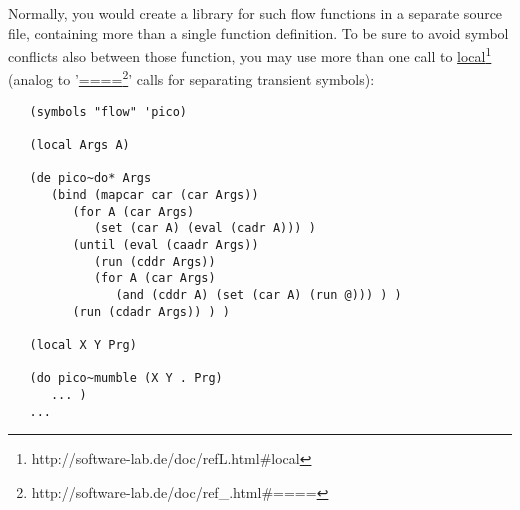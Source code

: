 Normally, you would create a library for such flow functions in a separate
source file, containing more than a single function definition. To be sure to
avoid symbol conflicts also between those function, you may use more than one
call to \underline{local}\footnote{http://software-lab.de/doc/refL.html\#local} (analog to
'\underline{====}\footnote{http://software-lab.de/doc/ref\_.html\#====}' calls for separating
transient symbols):
\begin{verbatim}
   (symbols "flow" 'pico)

   (local Args A)

   (de pico~do* Args
      (bind (mapcar car (car Args))
         (for A (car Args)
            (set (car A) (eval (cadr A))) )
         (until (eval (caadr Args))
            (run (cddr Args))
            (for A (car Args)
               (and (cddr A) (set (car A) (run @))) ) )
         (run (cdadr Args)) ) )

   (local X Y Prg)

   (do pico~mumble (X Y . Prg)
      ... )
   ...
\end{verbatim}

